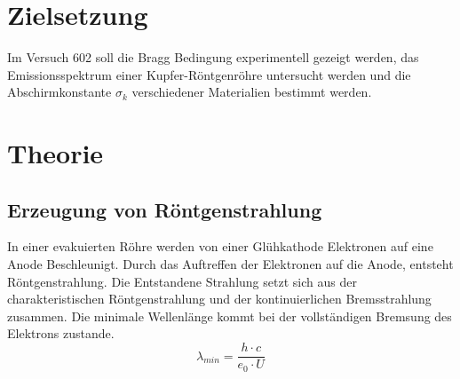 \section{Zielsetzung}
\label{sec:Zielsetzung}

Im Versuch 602 soll die Bragg Bedingung experimentell gezeigt werden, das Emissionsspektrum einer Kupfer-Röntgenröhre untersucht werden
und die Abschirmkonstante $σ_k$ verschiedener Materialien bestimmt werden.

\section{Theorie}
\label{sec:Theorie}

\subsection{Erzeugung von Röntgenstrahlung}
\label{sec:Erzeugung_von_Roentgenstrahlung}

In einer evakuierten Röhre werden von einer Glühkathode Elektronen auf eine Anode Beschleunigt. 
Durch das Auftreffen der Elektronen auf die Anode, entsteht Röntgenstrahlung. Die Entstandene Strahlung
setzt sich aus der charakteristischen Röntgenstrahlung und der kontinuierlichen Bremsstrahlung zusammen. 
Die minimale Wellenlänge kommt bei der vollständigen Bremsung des Elektrons zustande.\\
\begin{equation*}\label{eq:lambda_min}
    \lambda_{min} = \frac{h \cdot c}{e_0 \cdot U}
\end{equation*}

